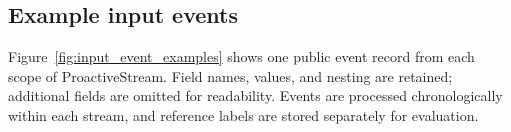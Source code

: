 \subsection{Example input events}
\label{app:input_event_examples}

Figure~\ref{fig:input_event_examples} shows one public event record from each scope of ProactiveStream.
Field names, values, and nesting are retained; additional fields are omitted for readability.
Events are processed chronologically within each stream, and reference labels are stored separately for evaluation.



